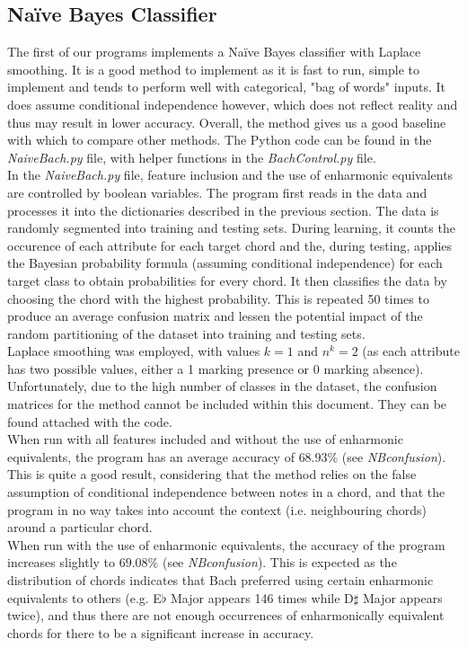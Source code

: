 \documentclass[a4paper]{article}
\begin{document}
\subsection{Naïve Bayes Classifier}
The first of our programs implements a Naïve Bayes classifier with Laplace smoothing. It is a good method to implement as it is fast to run, simple to implement and tends to perform well with categorical, "bag of words" inputs. It does assume conditional independence however, which does not reflect reality and thus may result in lower accuracy. Overall, the method gives us a good baseline with which to compare other methods. The Python code can be found in the \textit{NaiveBach.py} file, with helper functions in the \textit{BachControl.py} file. 
\\[12pt]
In the \textit{NaiveBach.py} file, feature inclusion and the use of enharmonic equivalents are controlled by boolean variables. The program first reads in the data and processes it into the dictionaries described in the previous section. The data is randomly segmented into training and testing sets. During learning, it counts the occurence of each attribute for each target chord and the, during testing, applies the Bayesian probability formula (assuming conditional independence) for each target class to obtain probabilities for every chord. It then classifies the data by choosing the chord with the highest probability. This is repeated 50 times to produce an average confusion matrix and lessen the potential impact of the random partitioning of the dataset into training and testing sets.
\\[12pt]
Laplace smoothing was employed, with values $k=1$ and $n^{k}=2$ (as each attribute has two possible values, either a 1 marking presence or 0 marking absence). 
\\[12pt]
Unfortunately, due to the high number of classes in the dataset, the confusion matrices for the method cannot be included within this document. They can be found attached with the code.
\\[12pt]
When run with all features included and without the use of enharmonic equivalents, the program has an average accuracy of $68.93\%$ (see \textit{NB\textunderscore confusion}). This is quite a good result, considering that the method relies on the false assumption of conditional independence between notes in a chord, and that the program in no way takes into account the context (i.e. neighbouring chords) around a particular chord.
\\[12pt]
When run with the use of enharmonic equivalents, the accuracy of the program increases slightly to $69.08\%$ (see \textit{NB\textunderscore confusion}). This is expected as the distribution of chords indicates that Bach preferred using certain enharmonic equivalents to others (e.g. E$\flat$ Major appears 146 times while D$\sharp$ Major appears twice), and thus there are not enough occurrences of enharmonically equivalent chords for there to be a significant increase in accuracy.
\end{document}
